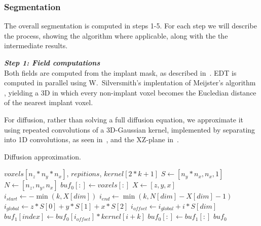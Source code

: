 \subsubsection{Segmentation}
The overall segmentation is computed in steps 1-5. For each step we will describe the process, showing
the algorithm where applicable, along with the the intermediate results.

\vspace{\baselineskip}
\noindent\textit{\textbf{Step 1: Field computations}}\\
Both fields are computed from the implant mask, as described in~.
EDT is computed in parallel using W.~Silversmith's implentation of Meijster's algorithm \cite{pypi-edt},
yielding a 3D in which every non-implant voxel becomes the Eucledian distance of the nearest implant voxel.

For diffusion, rather than solving a full diffusion equation, we approximate it using repeated convolutions
of a 3D-Gaussian kernel, implemented by separating into 1D convolutions, as seen in~, and the XZ-plane in~.

\begin{algorithm}
    \caption{Diffusion approximation.}
    \label{alg:diffusion}
    \begin{algorithmic}
         {$voxels[n_z*n_y*n_x]$, $repitions$, \newline \indent \indent $kernel[2*k+1]$}
            \State $S \gets [n_y * n_x, n_x, 1]$
            \State $N \gets [n_z, n_y, n_x]$
            \State $buf_0[:] \gets voxels[:]$
                        \State $X \gets [z,y,x]$
                        \State $i_{start} \gets - \min (k, X[dim])$
                        \State $i_{end} \gets \min (k, N[dim] - X[dim] - 1)$
                        \State $i_{global} \gets z*S[0] + y*S[1] + x*S[2]$
                            \State $i_{offset} \gets i_{global} + i*S[dim]$
                            \State $buf_1[index] \gets buf_0[i_{offset}] * kernel[i+k]$
                        \EndFor
                    \EndFor
                    \State $buf_0[:] \gets buf_1[:]$
                \EndFor
            \EndFor
            \Return $buf_0$
        \EndFunction
    \end{algorithmic}
\end{algorithm}

